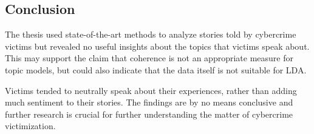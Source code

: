\subsection{Conclusion}

The thesis used state-of-the-art methods to analyze stories told by cybercrime victims but revealed no useful insights about the topics that victims speak about. This may support the claim that coherence is not an appropriate measure for topic models, but could also indicate that the data itself is not suitable for LDA.

Victims tended to neutrally speak about their experiences, rather than adding much sentiment to their stories. The findings are by no means conclusive and further research is crucial for further understanding the matter of cybercrime victimization.